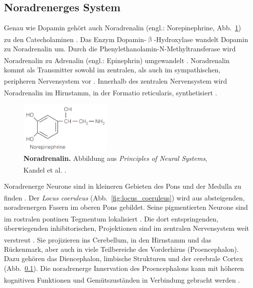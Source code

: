 \documentclass[12pt,a4paper,pdftex]{article}
\begin{document}
\subsection{Noradrenerges System}
\label{noradrenerges_system}
Genau wie Dopamin gehört auch Noradrenalin (engl.: Norepinephrine, Abb.~\ref{fig:noradrenalin}) zu den Catecholaminen \textsuperscript{\cite[1]{trepel2011neuroanatomie}}. Das Enzym Dopamin-$\upbeta$-Hydroxylase wandelt Dopamin zu Noradrenalin um. Durch die Phenylethanolamin-N-Methyltransferase wird Noradrenalin zu Adrenalin (engl.: Epinephrin) umgewandelt \textsuperscript{\cite[13]{kandel2013principles}}. Noradrenalin kommt als Transmitter sowohl im zentralen, als auch im sympathischen, peripheren Nervensystem vor \textsuperscript{\cite[4]{crossman2014neuroanatomy}}. Innerhalb des zentralen Nervensystem wird Noradrenalin im Hirnstamm, in der Formatio reticularis, synthetisiert \textsuperscript{\cite[7]{trepel2011neuroanatomie}}.

\begin{figure}[H]
    \centering
    \includegraphics[width=0.4\textwidth]{pictures/Bilder_monoamine_systeme/noradrenalin.PNG}
    \caption[Noradrenalin]{\textbf{Noradrenalin.} Abbildung aus \textit{Principles of Neural Systems}, Kandel et al. \textsuperscript{\cite[13]{kandel2013principles}}.}
    \label{fig:noradrenalin}
\end{figure}

Noradrenerge Neurone sind in kleineren Gebieten des Pons und der Medulla zu finden \textsuperscript{\cite[24]{kandel2013principles}}. Der \textit{Locus coeruleus} (Abb.~\ref{fig:locus_coeruleus}) wird aus absteigenden, noradrenergen Fasern im oberen Pons gebildet. Seine pigmentierten Neurone sind im rostralen pontinen Tegmentum lokalisiert \textsuperscript{\cite[8]{crossman2014neuroanatomy}}. Die dort entspringenden, überwiegenden inhibitorischen, Projektionen sind im zentralen Nervensystem weit verstreut \textsuperscript{\cite[6]{trepel2011neuroanatomie}}. Sie projizieren ins Cerebellum, in den Hirnstamm und das Rückenmark, aber auch in viele Teilbereiche des Vorderhirns (Proencephalon). Dazu gehören das Diencephalon, limbische Strukturen und der cerebrale Cortex (Abb.~\ref{noradrenerges_system}). Die noradrenerge Innervation des Proencephalons kann mit höheren kognitiven Funktionen und Gemütszuständen in Verbindung gebracht werden \textsuperscript{\cite[8]{crossman2014neuroanatomy}}.
\end{document}
